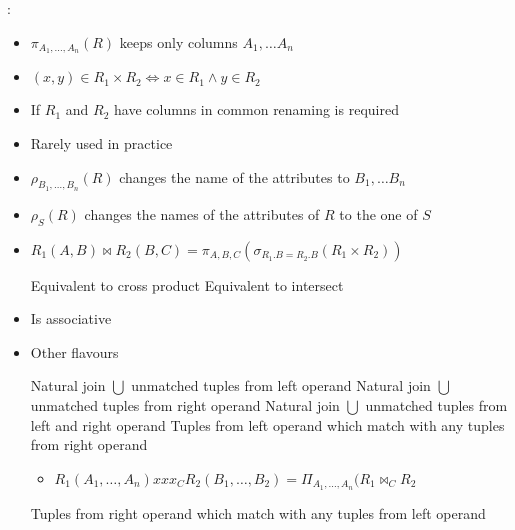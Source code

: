 \begin{itemize}
\begin{itemize}
            :
                \begin{itemize}
                    \item $\pi_{A_1,\dots,A_n} (R)$ keeps only columns $A_1, \dots A_n$
                \end{itemize}
                \begin{itemize}
                    \item $(x, y) \in R_1 \times R_2 \iff x \in R_1 \land y \in R_2$
                    \item If $R_1$ and $R_2$ have columns in common renaming is required
                    \item Rarely used in practice
                \end{itemize}
                \begin{itemize}
                    \item $\rho_{B_1, \dots, B_n} (R)$ changes the name of the attributes to $B_1, \dots B_n$
                    \item $\rho_S(R)$ changes the names of the attributes of $R$ to the one of $S$
                \end{itemize}
                \begin{itemize}
                    \item $R_1 (A, B) \bowtie R_2 (B, C) = \pi_{A, B, C} (\sigma_{R_1.B = R_2.B}(R_1 \times R_2))$
                            \begin{itemize}
                                 Equivalent to cross product
                                 Equivalent to intersect
                            \end{itemize}
                    \item Is associative
                    \item Other flavours
                        \begin{itemize}
                             Natural join $\bigcup$ unmatched tuples from left operand
                             Natural join $\bigcup$ unmatched tuples from right operand
                             Natural join $\bigcup$ unmatched tuples from left and right operand
                             Tuples from left operand which match with any tuples from right operand
                                \begin{itemize}
                                    \item $R_1(A_1, \dots, A_n) xxx_C R_2(B_1, \dots, B_2) = \Pi_{A_1, \dots, A_n}(R_1 \bowtie_C R_2$
                                \end{itemize}
                             Tuples from right operand which match with any tuples from left operand


\end{itemize}
\end{itemize}
\end{itemize}
\end{itemize}

